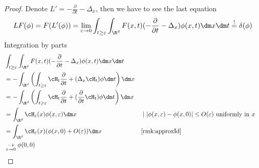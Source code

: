 	\begin{proof}
		Denote $L' = -  \frac{\partial}{\partial t} - \Delta_x$, then we have to see the last equation
		\[LF (\phi) = F(L'(\phi)) = \lim_{\varepsilon \to 0} \int_{t \ge \varepsilon} \int_{\R^d} F(x,t) ( -\frac{\partial}{\partial t} - \Delta_x) \phi(x,t) \dm x \dm t \overset{!}{=} \delta(\phi)
		\]
		Integration by parts
		\begin{align*}
			& \int_{t \ge \varepsilon} \int_{\R^d} F(x,t) ( -\frac{\partial}{\partial t} - \Delta_x) \phi(x,t) \dm x \dm t \\ 
			&= -  \int_{\R^d} \left(\int_{t \ge \varepsilon} \cH_t \frac{\partial}{\partial t} + (\Delta_x \cH_t) \phi \dm t \right) \dm x \\
			&= - \int_{\R^d} \left(\int_{t \ge \varepsilon} \cH_t \frac{\partial}{\partial t} + ( \frac{\partial}{\partial t} \cH_t) \phi \dm t \right ) \dm x \\
			&= \int_{\R^d} \cH_\varepsilon(x) \phi(x,\varepsilon) \dm x && \mid |\phi(x,\varepsilon) - \phi(x,0)| \le O(\varepsilon) \text{ uniformly in } x \\
			&= \int_{\R^d} \cH_\varepsilon(x) (\phi(x,0) + O(\varepsilon)) \dm x && \ref{rmk:approxId}\\
			&\underset{\varepsilon \to 0}{\to} \phi(0,0)
		\end{align*}
	\end{proof}
	
